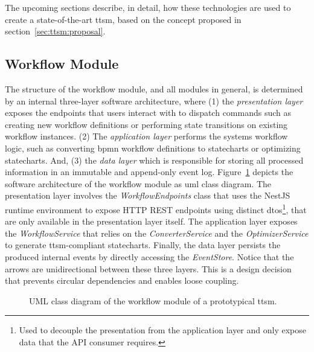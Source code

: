 The upcoming sections describe, in detail, how these technologies are used to create a state-of-the-art \gls{ttsm}, based on the concept proposed in section~\ref{sec:ttsm:proposal}.


\subsection{Workflow Module}
\label{sec:ttsm:prototype:workflow_module}
The structure of the workflow module, and all modules in general, is determined by an internal three-layer software architecture, where (1) the \textit{presentation layer} exposes the endpoints that users interact with to dispatch commands such as creating new workflow definitions or performing state transitions on existing workflow instances. (2) The \textit{application layer} performs the systems workflow logic, such as converting \gls{bpmn} workflow definitions to statecharts or optimizing statecharts. And, (3) the \textit{data layer} which is responsible for storing all processed information in an immutable and append-only event log. Figure~\ref{fig:prototype:workflow_module_class_diagram} depicts the software architecture of the workflow module as \gls{uml} class diagram. The presentation layer involves the \textit{WorkflowEndpoints} class that uses the NestJS runtime environment to expose HTTP REST endpoints using distinct \glspl{dto}\footnote{Used to decouple the presentation from the application layer and only expose data that the API consumer requires.}, that are only available in the presentation layer itself. The application layer exposes the \textit{WorkflowService} that relies on the \textit{ConverterService} and the \textit{OptimizerService} to generate \gls{ttsm}-compliant statecharts. Finally, the data layer persists the produced internal events by directly accessing the \textit{EventStore}. Notice that the arrows are unidirectional between these three layers. This is a design decision that prevents circular dependencies and enables loose coupling.

\begin{figure}[h]
    \caption{UML class diagram of the workflow module of a prototypical \gls{ttsm}.}
    \label{fig:prototype:workflow_module_class_diagram}
\end{figure}

